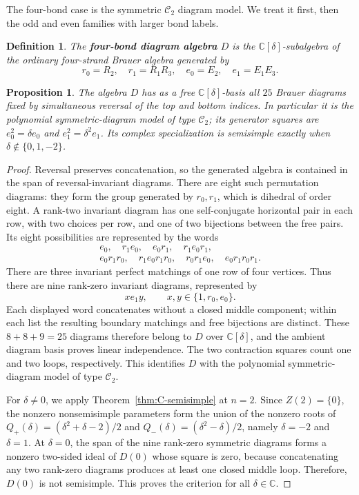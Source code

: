 \documentclass[11pt,a4paper]{amsart}
\newtheorem{proposition}[theorem]{Proposition}
\theoremstyle{uprightdefinition}
\newtheorem{definition}[theorem]{Definition}
\theoremstyle{remark}\newtheorem{remark}[theorem]{Remark}
\begin{document}
The four-bond case is the symmetric $\mathscr{C}_2$ diagram model. We treat it
first, then the odd and even families with larger bond labels.

\begin{definition}\label{def:i24-model}
The \textbf{four-bond diagram algebra} $D$ is the
$\mathbb C[\delta]$-subalgebra of the ordinary four-strand Brauer algebra generated by
\[
 r_0=R_2,\quad r_1=R_1R_3,\quad e_0=E_2,\quad e_1=E_1E_3.
\]
\end{definition}

\begin{proposition}\label{prop:I24-C2}
The algebra $D$ has as a free $\mathbb C[\delta]$-basis all $25$ Brauer diagrams fixed by simultaneous reversal of the top and bottom indices.  In particular it is the polynomial symmetric-diagram model of type $\mathscr{C}_2$; its generator squares are $e_0^2=\delta e_0$ and $e_1^2=\delta^2e_1$.  Its complex specialization is semisimple exactly when $\delta\notin\{0,1,-2\}$.
\end{proposition}
\begin{proof}
Reversal preserves concatenation, so the generated algebra is
contained in the span of reversal-invariant diagrams. There are eight
such permutation diagrams: they form the group generated by $r_0,r_1$,
which is dihedral of order eight. A rank-two invariant diagram has one
self-conjugate horizontal pair in each row, with two choices per row,
and one of two bijections between the free pairs. Its eight possibilities
are represented by the words
\[
\begin{gathered}
 e_0,\quad r_1e_0,\quad e_0r_1,\quad r_1e_0r_1,\\
 e_0r_1r_0,\quad r_1e_0r_1r_0,\quad
 r_0r_1e_0,\quad e_0r_1r_0r_1.
\end{gathered}
\]
There are three invariant perfect matchings of one row of four vertices.
Thus there are nine rank-zero invariant diagrams, represented by
\[
 x e_1 y,\qquad x,y\in\{1,r_0,e_0\}.
\]
Each displayed word concatenates without a closed middle component;
within each list the resulting boundary matchings and free bijections
are distinct. These $8+8+9=25$ diagrams therefore belong to $D$ over
$\mathbb C[\delta]$, and the ambient diagram basis proves linear independence.
The two contraction squares count one and two loops, respectively.
This identifies $D$ with the polynomial symmetric-diagram model of
type $\mathscr{C}_2$.

For $\delta\ne0$, we apply Theorem~\ref{thm:C-semisimple} at $n=2$. Since $Z(2)=\{0\}$, the nonzero nonsemisimple parameters form the union of the nonzero
roots of $Q_+(\delta)=(\delta^2+\delta-2)/2$ and
$Q_-(\delta)=(\delta^2-\delta)/2$, namely $\delta=-2$ and $\delta=1$. At $\delta=0$, the span of the nine rank-zero symmetric diagrams forms a nonzero two-sided ideal of $D(0)$ whose square is zero, because concatenating any two rank-zero diagrams produces at least one closed middle loop. Therefore, $D(0)$ is not semisimple. This proves the criterion for all $\delta\in\mathbb C$.
\end{proof}
\end{document}

